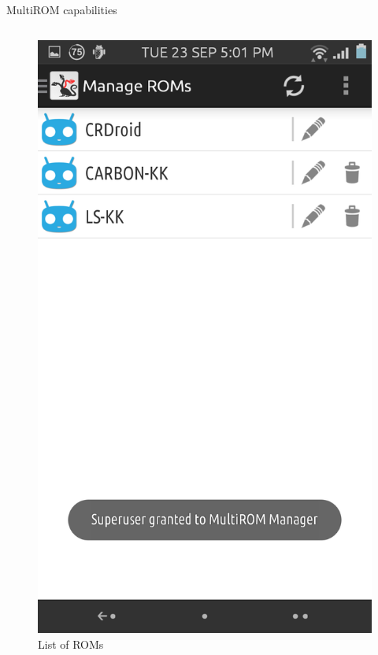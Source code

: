 \documentclass{beamer}
\begin{document}
 
 \begin{frame}{MultiROM capabilities}
 \begin{columns}
  \begin{column}{0.5\textwidth}
  \begin{figure}
  \includegraphics[scale=.08]{multirom}  
  \caption{List of ROMs}
  \end{figure}
  \end{column}
  

\end{columns}
\end{frame}
\end{document}
